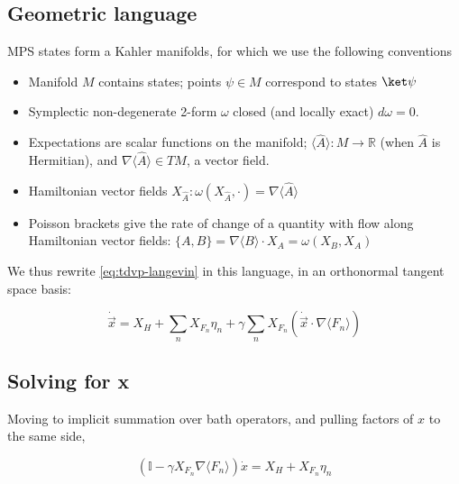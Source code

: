 \subsection{Geometric language}

        MPS states form a Kahler manifolds, for which we use the following conventions
        
        \begin{itemize}
            \item Manifold ${M}$ contains states; points $\psi\in {M}$ correspond to states $\ket\psi$ \\
            \item Symplectic non-degenerate 2-form $\omega$ closed (and locally exact) $d\omega=0$.\\
            \item Expectations are scalar functions on the manifold; $\langle \hat A \rangle: M\to \mathbb{R}$ (when $\hat A$ is Hermitian), and $\nabla\langle \hat A \rangle \in TM$, a vector field. \\
            \item Hamiltonian vector fields $X_{\hat A} : \omega(X_{\hat A}, \cdot)=\nabla\langle \hat A \rangle$\\
            \item Poisson brackets give the rate of change of a quantity with flow along Hamiltonian vector fields: $ \{ A, B \}  = \nabla\langle B \rangle \cdot X_A = \omega(X_B, X_A) $
        \end{itemize}

        We thus rewrite \ref{eq:tdvp-langevin} in this language, in an orthonormal tangent space basis:

        \begin{equation}\label{eq:geometric_tdvpl}
            \dot{\vec{x}} = X_H +\sum_n X_{F_n}\eta_n + \gamma \sum_n X_{F_n} (\dot{\vec x}\cdot \nabla\langle F_n\rangle)
        \end{equation}

    \subsection{Solving for x}

        Moving to implicit summation over bath operators, and pulling factors of $x$ to the same side,

        \begin{equation*}
            (\mathbb{I} - \gamma X_{F_n}\nabla\langle F_n\rangle)\dot x = X_H + X_{F_n} \eta_n
        \end{equation*}

